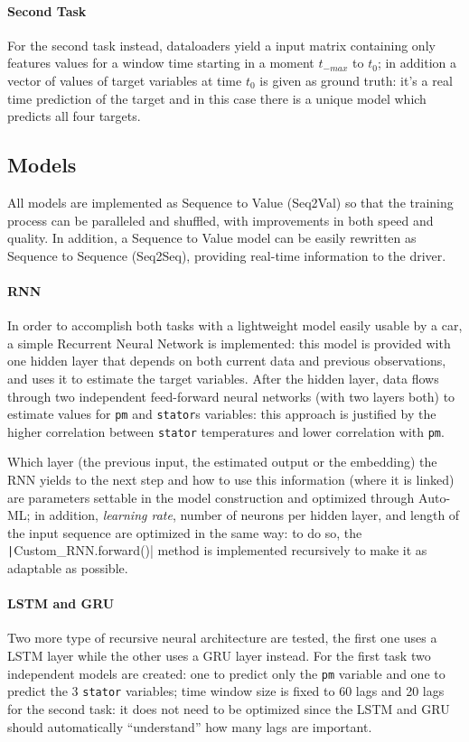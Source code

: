 \paragraph{Second Task}
For the second task instead, dataloaders yield a input matrix containing only features values for a window time starting in a moment $t_{-max}$ to $t_0$; in addition a vector of values of target variables at time $t_0$ is given as ground truth: it's a real time prediction of the target and in this case there is a unique model which predicts all four targets.

\subsection{Models}
All models are implemented as Sequence to Value (Seq2Val) so that the training process can be paralleled and shuffled, with improvements in both speed and quality.
In addition, a Sequence to Value model can be easily rewritten as Sequence to Sequence (Seq2Seq), providing real-time information to the driver.

\paragraph{RNN}
In order to accomplish both tasks with a lightweight model easily usable by a car, a simple Recurrent Neural Network is implemented: this model is provided with one hidden layer that depends on both current data and previous observations, and uses it to estimate the target variables.
After the hidden layer, data flows through two independent feed-forward neural networks (with two layers both) to estimate values for \verb|pm| and \verb|stator|s variables: this approach is justified by the higher correlation between \verb|stator| temperatures and lower correlation with \verb|pm|.

Which layer (the previous input, the estimated output or the embedding) the RNN yields to the next step and how to use this information (where it is linked) are parameters settable in the model construction and optimized through Auto-ML; in addition, \textit{learning rate}, number of neurons per hidden layer, and length of the input sequence are optimized in the same way: to do so, the \texttt|Custom_RNN.forward()| method is implemented recursively to make it as adaptable as possible.

\paragraph{LSTM and GRU}
Two more type of recursive neural architecture are tested, the first one uses a LSTM layer while the other uses a GRU layer instead.
For the first task two independent models are created: one to predict only the \verb|pm| variable and one to predict the 3 \verb|stator| variables; time window size is fixed to 60 lags and 20 lags for the second task: it does not need to be optimized since the LSTM and GRU should automatically ``understand'' how many lags are important.

